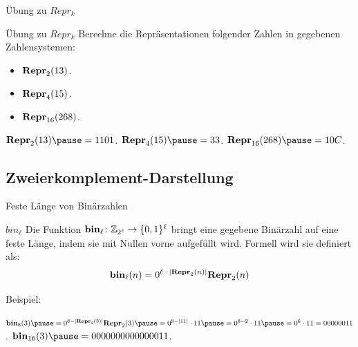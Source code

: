 \documentclass[handout]{beamer}
\begin{document}
\begin{frame}{Übung zu $Repr_k$}
\begin{taskblock}{Übung zu $Repr_k$}
Berechne die Repräsentationen folgender Zahlen in gegebenen Zahlensystemen:
\begin{itemize}
\item $\textbf{Repr}_2(13)$.
\item $\textbf{Repr}_4(15)$.
\item $\textbf{Repr}_{16} (268)$.
\end{itemize}
\end{taskblock}

\begin{itemize}
\pitem $\fRepr_2(13) \p = 1101$.
\pitem $\fRepr_4(15) \p = 33$.
\pitem $\fRepr\uhd (268) \p = 10C$.
\end{itemize}
\end{frame}

\subsection{Zweierkomplement-Darstellung}

\begin{frame}{Feste Länge von Binärzahlen}
\pause

\begin{block}{$bin_\ell$}
Die Funktion $\textbf{bin}_{\ell}\colon \mathbb{Z}_{2^{\ell}} \to \{0,1\}^{\ell}$ \p  bringt eine gegebene Binärzahl auf eine feste Länge\p , indem sie mit Nullen vorne aufgefüllt wird. \p Formell wird sie definiert als:\p
\begin{align*}\textbf{bin}_{\ell}(n) = 0^{\ell- |\textbf{Repr}_2(n)|} \textbf{Repr}_2(n)\end{align*}
\end{block}

\pause Beispiel:
\begin{itemize}
\pitem $\fbin_8(3) \p = 0^{8 - |\fRepr_2(3)|}\fRepr_2(3) \p = 0^{8 - |11|}\cdot 11 \p = 0^{8 - 2} \cdot 11 \p = 0^6 \cdot 11 = 00000011$.
\pitem $\fbin_{16}(3) \p = 0000000000000011$.
\end{itemize}
\end{frame}

\newcommand{\definitionOfZkpl}{
\begin{align*}
\fZkpl_{\ell}(x) =
\begin{cases}
0 \fbin_{\ell-1}(x) & \text{ falls } x\geq 0 \\
1 \fbin_{\ell-1}(2^{\ell-1} + x) & \text{ falls } x< 0 
\end{cases}
\end{align*}
}
\end{document}
